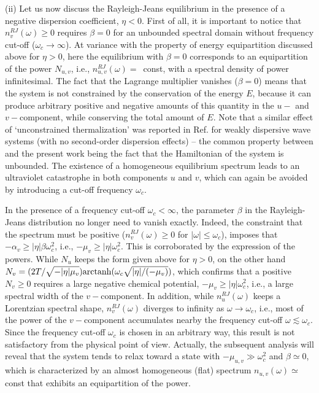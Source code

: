 \documentclass[pra,twocolumn,showpacs,preprintnumbers,amsmath,amssymb]{revtex4}
\begin{document}
(ii) Let us now discuss the Rayleigh-Jeans  equilibrium in the presence of a negative dispersion coefficient, $\eta < 0$. 
First of all, it is important to notice that $n_{v}^{RJ}(\omega) \ge 0$ requires $\beta=0$ for an unbounded spectral domain without frequency cut-off ($\omega_c \to \infty$). 
At variance with the property of energy equipartition discussed above for $\eta >0$, here the equilibrium with $\beta=0$ corresponds to an equipartition of the power $N_{u,v}$, i.e., $n_{u,v}^{RJ}(\omega) =$~const, with a spectral density of power infinitesimal. 
The fact that the Lagrange multiplier vanishes ($\beta=0$) means that the system is not constrained by the conservation of the energy $E$, because it can produce arbitrary positive and negative amounts of  this quantity in the $u-$ and $v-$component, while conserving the total amount of $E$. 
Note that a similar effect of `unconstrained thermalization' was reported in Ref.\cite{PRX17} for weakly dispersive wave systems (with no second-order dispersion effects) -- the common property between \cite{PRX17} and the present work being the fact that the Hamiltonian of the system is unbounded.
The existence of a homogeneous equilibrium spectrum  
leads to an ultraviolet catastrophe in both components $u$ and $v$, which can again be avoided by introducing a cut-off frequency $\omega_c$.


In the presence of a frequency cut-off $\omega_c < \infty$, the parameter $\beta$ in the Rayleigh-Jeans distribution no longer need to vanish exactly.
Indeed, the constraint that the spectrum must be positive ($n_{v}^{RJ}(\omega) \ge 0$ for  $|\omega| \le \omega_c$), imposes that $-\alpha_v \ge |\eta| \beta \omega_c^2$, i.e., $-\mu_v \ge |\eta| \omega_c^2$.
This is corroborated by the expression of the powers.
While $N_u$ keeps the form given above for $\eta >0$, on the other hand $N_v=(2 T /\sqrt{-|\eta| \mu_v}) {\rm arctanh}(\omega_c \sqrt{|\eta|/(-\mu_v)})$, which confirms that a positive $N_v \ge 0$ requires a large negative chemical potential, $-\mu_v \ge |\eta| \omega_c^2$, i.e., a large spectral width of the $v-$component. 
In addition, while $n_u^{RJ}(\omega)$ keeps a Lorentzian spectral shape, $n_v^{RJ}(\omega)$ diverges to infinity as $\omega \to \omega_c$, i.e., most of the power  of the $v-$component accumulates nearby the frequency cut-off $\omega \lesssim \omega_c$.
Since the frequency cut-off $\omega_c$ is chosen in an arbitrary way, this result is not satisfactory from the physical point of view.
Actually, the subsequent analysis will reveal that the system tends to relax toward a state with $-\mu_{u,v} \gg \omega_c^2$ and $\beta \simeq 0$, which is characterized by  an almost homogeneous (flat) spectrum $n_{u,v}(\omega) \simeq $const that exhibits an equipartition of the power.
\end{document}
